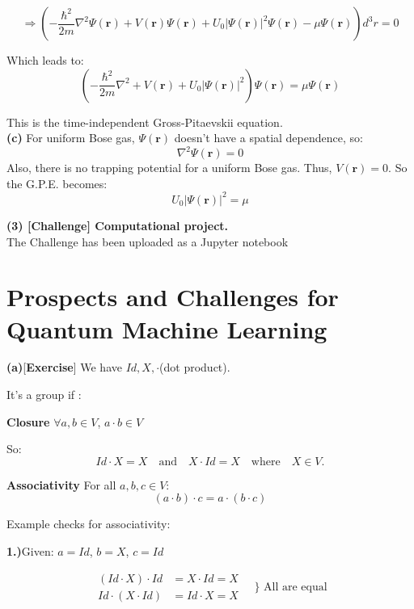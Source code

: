 \documentclass{article}
\begin{document}
\[
\Rightarrow \left( -\frac{\hbar^2}{2m} \nabla^2 \Psi(\mathbf{r}) + V(\mathbf{r}) \Psi(\mathbf{r}) + U_0 |\Psi(\mathbf{r})|^2 \Psi(\mathbf{r}) - \mu \Psi(\mathbf{r}) \right) d^3r = 0
\]

Which leads to:
\[
\left( -\frac{\hbar^2}{2m} \nabla^2 + V(\mathbf{r}) + U_0 |\Psi(\mathbf{r})|^2 \right) \Psi(\mathbf{r}) = \mu \Psi(\mathbf{r})
\]

This is the time-independent Gross-Pitaevskii equation.
\vspace{1cm}\\
\textbf{(c)} For uniform Bose gas, $\Psi(\mathbf{r})$ doesn't have a spatial dependence, so:
\[
\nabla^2 \Psi(\mathbf{r}) = 0
\]
Also, there is no trapping potential for a uniform Bose gas. Thus, $V(\mathbf{r}) = 0$. So the G.P.E. becomes:
\[
U_0 |\Psi(\mathbf{r})|^2 = \mu
\]

\textbf{(3) [Challenge] Computational project.} \\

The Challenge has been uploaded as a Jupyter notebook


\section*{ Prospects and Challenges for Quantum Machine Learning}

\textbf{(a)}[\textbf{Exercise}]
We have \( Id, X,\cdot\)(dot product).

It's a group if :


\textbf{Closure}
\( \forall a, b \in V \), \( a \cdot b \in V \)

So:
\[
Id \cdot X = X \quad \text{and} \quad X \cdot Id = X \quad \text{where} \quad X \in V.
\]


\textbf{Associativity}
For all \( a, b, c \in V \):
\[
(a \cdot b) \cdot c = a \cdot (b \cdot c)
\]

Example checks for associativity:


\textbf{1.)}Given: \( a = Id \), \( b = X \), \( c = Id \)

\[
\begin{aligned}
(Id \cdot X) \cdot Id &= X \cdot Id = X \\
Id \cdot (X \cdot Id) &= Id \cdot X = X
\end{aligned}
\quad \} \text{ All are equal}
\]
\end{document}
